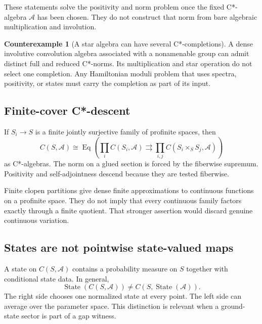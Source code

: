 \documentclass[12pt]{article}
\theoremstyle{definition}
\newtheorem{counterexample}[theorem]{Counterexample}
\theoremstyle{remark}
\newcommand{\A}{\mathcal A}
\newcommand{\State}{\operatorname{State}}
\begin{document}
These statements solve the positivity and norm problem once the fixed
C*-algebra $\A$ has been chosen.  They do not construct that norm from bare
algebraic multiplication and involution.

\begin{counterexample}[A star algebra can have several C*-completions]
A dense involutive convolution algebra associated with a nonamenable group
can admit distinct full and reduced C*-norms.  Its multiplication and star
operation do not select one completion.  Any Hamiltonian moduli problem that
uses spectra, positivity, or states must carry the completion as part of its
input.
\end{counterexample}

\subsection{Finite-cover C*-descent}

If $S_i\to S$ is a finite jointly surjective family of profinite spaces, then
\begin{equation}
C(S,\A)
\cong
\operatorname{Eq}\left(
\prod_i C(S_i,\A)
\rightrightarrows
\prod_{i,j}C(S_i\times_S S_j,\A)
\right)
\label{eq:cstar-descent}
\end{equation}
as C*-algebras.  The norm on a glued section is forced by the fiberwise
supremum.  Positivity and self-adjointness descend because they are tested
fiberwise.

Finite clopen partitions give dense finite approximations to continuous
functions on a profinite space.  They do not imply that every continuous
family factors exactly through a finite quotient.  That stronger assertion
would discard genuine continuous variation.

\subsection{States are not pointwise state-valued maps}

A state on $C(S,\A)$ contains a probability measure on $S$ together with
conditional state data.  In general,
\begin{equation}
\State(C(S,\A))
\ne
C(S,\State(\A)).
\label{eq:state-warning}
\end{equation}
The right side chooses one normalized state at every point.  The left side
can average over the parameter space.  This distinction is relevant when a
ground-state sector is part of a gap witness.
\end{document}
